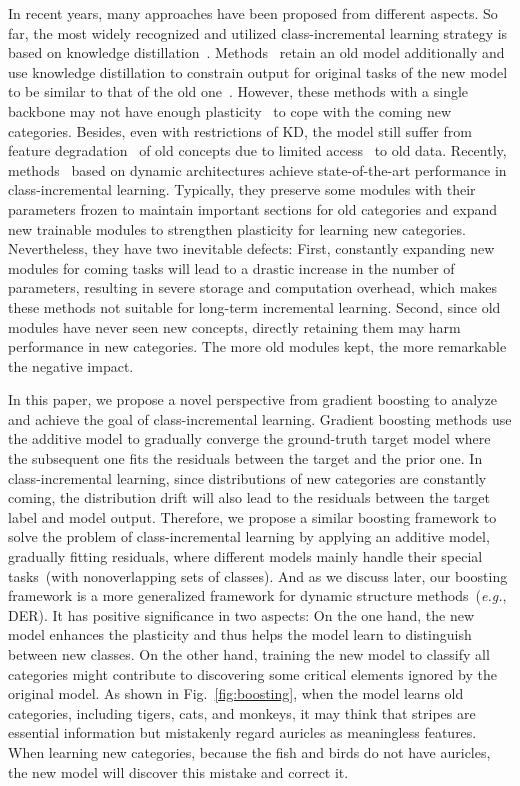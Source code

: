 \documentclass[runningheads]{llncs}
\begin{document}
In recent years, many approaches have been proposed from different aspects. So far, the most widely recognized and utilized class-incremental learning strategy is based on knowledge distillation~\cite{KD}. Methods~\cite{LWF,icarl,EEIL,bic,WA,zhou2021co} retain an old model additionally and use knowledge distillation to constrain output for original tasks of the new model to be similar to that of the old one~\cite{LWF}.    However, these methods with a single backbone may not have enough plasticity~\cite{stabilityplasticity} to cope with the coming new categories. Besides, even with restrictions of KD, the model still suffer from feature degradation~\cite{der} of old concepts due to limited access~\cite{delange2021continual}  to old data. Recently, methods~\cite{der,simpleder,dytox} based on dynamic architectures achieve state-of-the-art performance in class-incremental learning. Typically, they preserve some modules with their parameters frozen to maintain important sections for old categories and expand new trainable modules to strengthen plasticity for learning new categories. Nevertheless, they have two inevitable defects: First, constantly expanding new modules for coming tasks will lead to a drastic increase in the number of parameters, resulting in severe storage and computation overhead, which makes these methods not suitable for long-term incremental learning. Second, since old modules have never seen new concepts,  directly retaining them may harm performance in new categories. The more old modules kept, the more remarkable the negative impact.

 In this paper, we propose a novel perspective from gradient boosting to analyze and achieve the goal of class-incremental learning.  Gradient boosting methods use the additive model to gradually converge the ground-truth target model where the subsequent one fits the residuals between the target and the prior one. In class-incremental learning, since distributions of new categories are constantly coming, the distribution drift will also lead to the residuals between the target label and model output. Therefore, we propose a similar boosting framework to solve the problem of class-incremental learning by applying an additive model, gradually fitting residuals, where different models mainly handle their special tasks~(with nonoverlapping sets of classes). And as we discuss later, our boosting framework is a more generalized framework for dynamic structure methods~(\textit{e.g.}, DER\cite{der}). It has positive significance in two aspects: On the one hand, the new model enhances the plasticity and thus helps the model learn to distinguish between new classes. On the other hand, training the new model to classify all categories might contribute to discovering some critical elements ignored by the original model. As shown in Fig.~\ref{fig:boosting}, when the model learns old categories, including tigers, cats, and monkeys, it may think that stripes are essential information but mistakenly regard auricles as meaningless features. When learning new categories, because the fish and birds do not have auricles, the new model will discover this mistake and correct it. 
\end{document}
